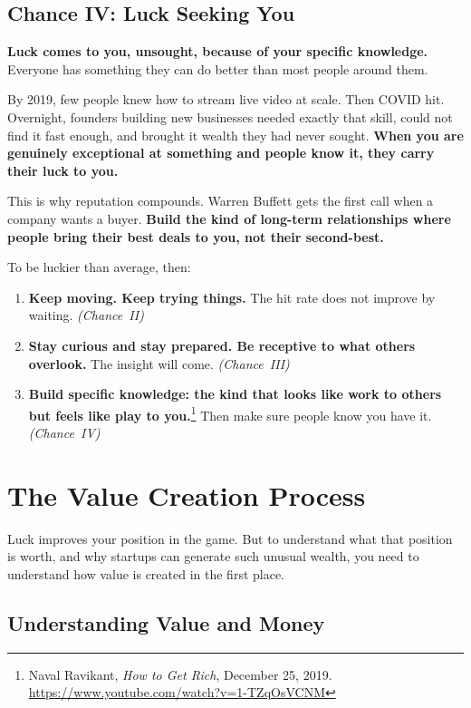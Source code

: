 \subsection{Chance IV: Luck Seeking You}

\textbf{Luck comes to you, unsought, because of your specific knowledge.} Everyone has something they can do better than most people around them.

By 2019, few people knew how to stream live video at scale. Then COVID hit. Overnight, founders building new businesses needed exactly that skill, could not find it fast enough, and brought it wealth they had never sought. \textbf{When you are genuinely exceptional at something and people know it, they carry their luck to you.}

This is why reputation compounds. Warren Buffett gets the first call when a company wants a buyer. \textbf{Build the kind of long-term relationships where people bring their best deals to you, not their second-best.}

\medskip
\noindent To be luckier than average, then:

\begin{enumerate}
  \item \textbf{Keep moving. Keep trying things.} The hit rate does not improve by waiting. \emph{(Chance~II)}
  \item \textbf{Stay curious and stay prepared. Be receptive to what others overlook.} The insight will come. \emph{(Chance~III)}
  \item \textbf{Build specific knowledge: the kind that looks like work to others but feels like play to you.}\footnote{Naval Ravikant, \emph{How to Get Rich}, December 25, 2019. \url{https://www.youtube.com/watch?v=1-TZqOsVCNM}} Then make sure people know you have it. \emph{(Chance~IV)}
\end{enumerate}

\section{The Value Creation Process}
\label{sec:ch01-value-creation}

Luck improves your position in the game. But to understand what that position is worth, and why startups can generate such unusual wealth, you need to understand how value is created in the first place.

\subsection{Understanding Value and Money}

